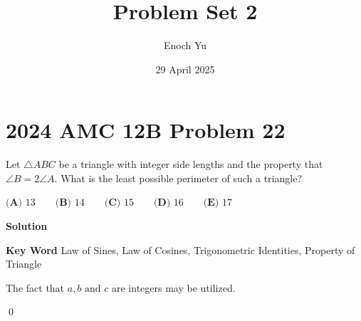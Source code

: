 \documentclass{article}
\title{Problem Set 2}
\author{Enoch Yu}
\date{29 April 2025}
\newenvironment{solution}{\begin{trivlist}\item[]
{\bf Solution}}{\qed \end{trivlist}}
\begin{document}
\section*{2024 AMC 12B Problem 22}
Let $\triangle{ABC}$ be a triangle with integer
side lengths and the property that
$\angle{B} = 2\angle{A}$. What is the least
possible perimeter of such a triangle?

$\textbf{(A) } 13 \qquad \textbf{(B) } 14 \qquad
\textbf{(C) } 15 \qquad \textbf{(D) } 16 \qquad
\textbf{(E) }17 \qquad$

\begin{solution}

\textbf{Key Word} Law of Sines, Law of Cosines,
Trigonometric Identities, Property of Triangle

\begin{center}
\end{center}
The fact that $a,b\text{ and }c$ are integers may be utilized.


\end{solution}
\end{document}
